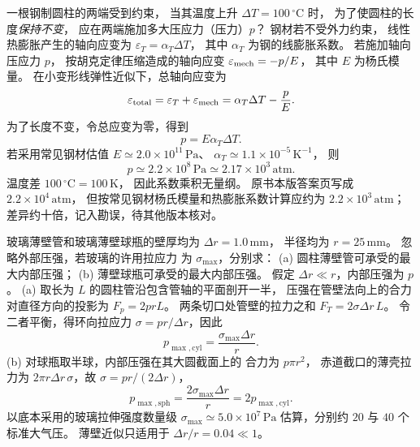 

一根钢制圆柱的两端受到约束，
当其温度上升 $\Delta T=100\,^\circ\mathrm C$ 时，
为了使圆柱的长度\emph{保持不变}，
应在两端施加多大压应力（压力）$p$？
\exsolution
钢材若不受外力约束，
线性热膨胀产生的轴向应变为
$\varepsilon_T=\alpha_T\Delta T$，
其中 $\alpha_T$ 为钢的线膨胀系数。
若施加轴向压应力 $p$，
按胡克定律压缩造成的轴向应变
$\varepsilon_{\rm mech}=-p/E$，
其中 $E$ 为杨氏模量。
在小变形线弹性近似下，总轴向应变为
\[
\varepsilon_{\rm total}
=\varepsilon_T+\varepsilon_{\rm mech}
=\alpha_T\Delta T-\frac pE.
\]
为了长度不变，令总应变为零，得到
\[
\boxed{p=E\alpha_T\Delta T}.
\]
若采用常见钢材估值
$E\simeq2.0\times10^{11}\,\mathrm{Pa}$、
$\alpha_T\simeq1.1\times10^{-5}\,\mathrm{K^{-1}}$，
则
\[
\boxed{p\simeq2.2\times10^8\,\mathrm{Pa}
\simeq2.17\times10^3\,\mathrm{atm}}.
\]
\excheck 温度差
$100\,^\circ\mathrm C=100\,\mathrm K$，
因此系数乘积无量纲。
原书本版答案页写成
$2.2\times10^4\,\mathrm{atm}$，
但按常见钢材杨氏模量和热膨胀系数计算应约为
$2.2\times10^3\,\mathrm{atm}$；
差异约十倍，记入勘误，待其他版本核对。


玻璃薄壁管和玻璃薄壁球瓶的壁厚均为
$\Delta r=1.0\,\mathrm{mm}$，
半径均为 $r=25\,\mathrm{mm}$。
忽略外部压强，若玻璃的许用拉应力
为 $\sigma_{\max}$，分别求：
(a) 圆柱薄壁管可承受的最大内部压强；
(b) 薄壁球瓶可承受的最大内部压强。
\exsolution
假定 $\Delta r\ll r$，内部压强为 $p$。
(a) 取长为 $L$ 的圆柱管沿包含管轴的平面剖开一半，
压强在管壁法向上的合力对直径方向的投影为
$F_p=2prL$。
两条切口处管壁的拉力之和
$F_T=2\sigma\Delta r\,L$。
令二者平衡，得环向拉应力
$\sigma=pr/\Delta r$，因此
\[
\boxed{p_{\max,\mathrm{cyl}}=
\frac{\sigma_{\max}\Delta r}{r}}.
\]
(b) 对球瓶取半球，内部压强在其大圆截面上的
合力为 $p\pi r^2$，
赤道截口的薄壳拉力为
$2\pi r\Delta r\,\sigma$，故
$\sigma=pr/(2\Delta r)$，
\[
\boxed{p_{\max,\mathrm{sph}}=
\frac{2\sigma_{\max}\Delta r}{r}
=2p_{\max,\mathrm{cyl}}}.
\]
\excheck 以底本采用的玻璃拉伸强度数量级
$\sigma_{\max}\simeq5.0\times10^7\,\mathrm{Pa}$
估算，分别约 $20$ 与 $40$ 个标准大气压。
薄壁近似只适用于 $\Delta r/r=0.04\ll1$。

